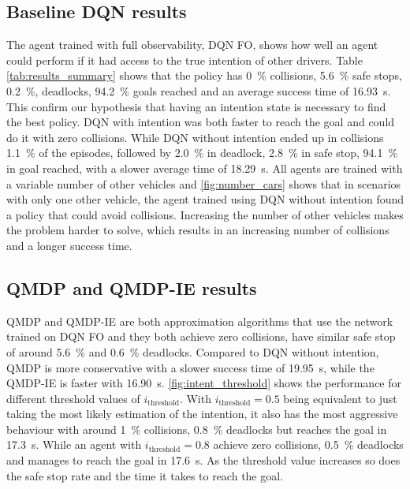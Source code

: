 	\subsection{Baseline DQN results}
	The agent trained with full observability, DQN FO, shows how well an agent could perform if it had access to the true intention of other drivers. Table \ref{tab:results_summary} shows that the policy has \SI{0}{\percent} collisions, \SI{5.6}{\percent} safe stops, \SI{.2}{\percent}, deadlocks, \SI{94.2}{\percent} goals reached and an average success time of \SI{16.93}{\second}. 
	This confirm our hypothesis that having an intention state is necessary to find the best policy. DQN with intention was both faster to reach the goal and could do it with zero collisions.
	While DQN without intention ended up in collisions \SI{1.1}{\percent} of the episodes, followed by \SI{2.0}{\percent} in deadlock, \SI{2.8}{\percent} in safe stop, \SI{94.1}{\percent}  in goal reached, with a slower average time of \SI{18.29}{\second}.  All agents are trained with a variable number of other vehicles and \ref{fig:number_cars} shows that in scenarios with only one other vehicle, the agent trained using DQN without intention found a policy that could avoid collisions. Increasing the number of other vehicles makes the problem harder to solve, which results in an increasing number of collisions and a longer success time. 
	

	
	
	\subsection{QMDP and QMDP-IE results}
	QMDP and QMDP-IE are both approximation algorithms that use the network trained on DQN FO and they both achieve zero collisions, have similar safe stop of around \SI{5.6}{\percent} and \SI{0.6}{\percent} deadlocks. Compared to DQN without intention, QMDP is more conservative with a slower success time of \SI{19.95}{\second}, while the QMDP-IE is faster with \SI{16.90}{\second}. \ref{fig:intent_threshold} shows the performance for different threshold values of $i_\text{threshold}$. With $i_\text{threshold}=0.5$ being equivalent to just taking the most likely estimation of the intention, it also has the most aggressive behaviour with around \SI{1}{\percent} collisions, \SI{0.8}{\percent} deadlocks but reaches the goal in \SI{17.3}{\second}. While an agent with $i_\text{threshold}=0.8$ achieve zero collisions, \SI{0.5}{\percent} deadlocks and manages to reach the goal in \SI{17.6}{\second}. As the threshold value increases so does the safe stop rate and the time it takes to reach the goal. 
	
